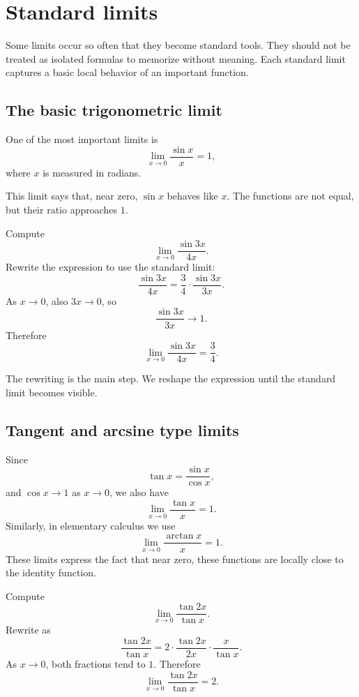 \section{Standard limits}

Some limits occur so often that they become standard tools. They should not be treated as isolated formulas to memorize without meaning. Each standard limit captures a basic local behavior of an important function.

\subsection*{The basic trigonometric limit}

One of the most important limits is
\[
\lim_{x\to0}\frac{\sin x}{x}=1,
\]
where \(x\) is measured in radians.

This limit says that, near zero, \(\sin x\) behaves like \(x\). The functions are not equal, but their ratio approaches \(1\).

\begin{examplebox}
Compute
\[
\lim_{x\to0}\frac{\sin 3x}{4x}.
\]
Rewrite the expression to use the standard limit:
\[
\frac{\sin 3x}{4x}=\frac34\cdot\frac{\sin 3x}{3x}.
\]
As \(x\to0\), also \(3x\to0\), so
\[
\frac{\sin 3x}{3x}\to1.
\]
Therefore
\[
\lim_{x\to0}\frac{\sin 3x}{4x}=\frac34.
\]
\end{examplebox}

The rewriting is the main step. We reshape the expression until the standard limit becomes visible.

\subsection*{Tangent and arcsine type limits}

Since
\[
\tan x=\frac{\sin x}{\cos x},
\]
and \(\cos x\to1\) as \(x\to0\), we also have
\[
\lim_{x\to0}\frac{\tan x}{x}=1.
\]
Similarly, in elementary calculus we use
\[
\lim_{x\to0}\frac{\arctan x}{x}=1.
\]
These limits express the fact that near zero, these functions are locally close to the identity function.

\begin{examplebox}
Compute
\[
\lim_{x\to0}\frac{\tan 2x}{\tan x}.
\]
Rewrite as
\[
\frac{\tan 2x}{\tan x}
=2\cdot\frac{\tan 2x}{2x}\cdot\frac{x}{\tan x}.
\]
As \(x\to0\), both fractions tend to \(1\). Therefore
\[
\lim_{x\to0}\frac{\tan 2x}{\tan x}=2.
\]
\end{examplebox}

